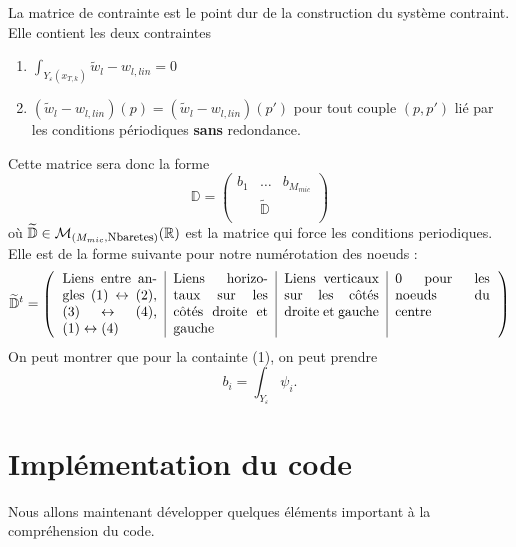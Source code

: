 \documentclass[11pt]{article}
\newcommand{\smbox}[1]{\mbox{\footnotesize #1}}
\newcommand{\R}{\mathbb{R}}
\newcommand{\D}{\mathbb{D}}
\newcommand{\tD}{\widetilde{\mathbb{D}}}
\newcommand{\Ye}{Y_\varepsilon}
\newcommand{\tw}{\tilde{w}}
\newcommand{\xtk}{x_{T,k}}
\begin{document}
La matrice de contrainte est le point dur de la construction du système contraint. Elle contient les deux contraintes
\begin{enumerate}
\item $\int_{\Ye(\xtk)} \tw_l - w_{l, lin} = 0$
\item $(\tw_l - w_{l, lin})(p) = (\tw_l - w_{l, lin})(p')$ pour tout couple $(p, p')$ lié par les conditions périodiques \textbf{sans} redondance.
\end{enumerate}
Cette matrice sera donc la forme
\[
  \D = \left(
    \begin{matrix}
      b_1 & \dots & b_{M_{mic}} \\
      ~ &  \tD & ~\\
    \end{matrix}
  \right)
\]
où $\tD \in \mathcal{M}_{(M_{mic}, \smbox{Nbaretes})}(\R)$ est la matrice qui force les conditions periodiques. Elle est de la forme suivante pour
notre numérotation des noeuds :
\[
  \tD^t = \left(
    \begin{tabular}{p{.2\textwidth}|p{.2\textwidth}|p{.2\textwidth}|p{.2\textwidth}}
      Liens entre angles
      $(1)\leftrightarrow(2)$,
      $(3)\leftrightarrow(4)$,
      $(1)\leftrightarrow(4)$
      &
        Liens horizotaux sur les côtés droite et gauche
      &
        Liens verticaux sur les côtés droite et gauche
      &
        0 pour les noeuds du centre
    \end{tabular}
  \right)
\]
On peut montrer que pour la containte (1), on peut prendre 
\[
  b_i = \int_{\Ye} \psi_i.
\]

\section{Implémentation du code}

Nous allons maintenant développer quelques éléments important à la compréhension du code. 
\end{document}
